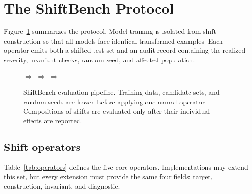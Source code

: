 \section{The ShiftBench Protocol}
\label{sec:protocol}

Figure~\ref{fig:pipeline} summarizes the protocol.  Model training is isolated
from shift construction so that all models face identical transformed examples.
Each operator emits both a shifted test set and an audit record containing the
realized severity, invariant checks, random seed, and affected population.

\begin{figure}[t]
  \centering
  \setlength{\fboxsep}{7pt}
  \;$\Longrightarrow$\;
  \;$\Longrightarrow$\;
  \;$\Longrightarrow$\;
  \caption{ShiftBench evaluation pipeline.  Training data, candidate sets, and
  random seeds are frozen before applying one named operator.  Compositions of
  shifts are evaluated only after their individual effects are reported.}
  \label{fig:pipeline}
\end{figure}

\subsection{Shift operators}

Table~\ref{tab:operators} defines the five core operators.  Implementations may
extend this set, but every extension must provide the same four fields: target,
construction, invariant, and diagnostic.

